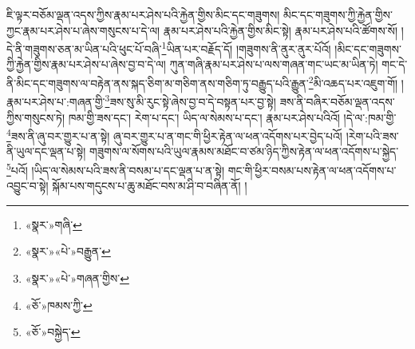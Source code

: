 ཇི་ལྟར་བཅོམ་ལྡན་འདས་ཀྱིས་རྣམ་པར་ཤེས་པའི་རྐྱེན་གྱིས་མིང་དང་གཟུགས། མིང་དང་གཟུགས་ཀྱི་རྐྱེན་གྱིས་ཀྱང་རྣམ་པར་ཤེས་པ་ཞེས་གསུངས་པ་དེ་ལ། རྣམ་པར་ཤེས་པའི་རྐྱེན་གྱིས་མིང་སྟེ། རྣམ་པར་ཤེས་པའི་ཚོགས་སོ། །དེ་ནི་གཟུགས་ཅན་མ་ཡིན་པའི་ཕུང་པོ་བཞི་\footnote{«སྣར་»གཞི་}ཡིན་པར་བརྗོད་དོ། །གཟུགས་ནི་ནུར་ནུར་པོའོ། །མིང་དང་གཟུགས་ཀྱི་རྐྱེན་གྱིས་རྣམ་པར་ཤེས་པ་ཞེས་བྱ་བ་དེ་ལ། ཀུན་གཞི་རྣམ་པར་ཤེས་པ་ལས་གཞན་གང་ཡང་མ་ཡིན་ཏེ། གང་དེ་ནི་མིང་དང་གཟུགས་ལ་བརྟེན་ནས་སྐད་ཅིག་མ་གཅིག་ནས་གཅིག་ཏུ་བརྒྱུད་པའི་རྒྱུན་\footnote{«སྣར་»«པེ་»བརྒྱུན་}མི་འཆད་པར་འཇུག་གོ། །རྣམ་པར་ཤེས་པ་:གཞན་གྱི་\footnote{«སྣར་»«པེ་»གཞན་གྱིས་}ཟས་སུ་མི་རུང་སྟེ་ཞེས་བྱ་བ་དེ་བསྟན་པར་བྱ་སྟེ། ཟས་ནི་བཞིར་བཅོམ་ལྡན་འདས་ཀྱིས་གསུངས་ཏེ། ཁམ་གྱི་ཟས་དང་། རེག་པ་དང་། ཡིད་ལ་སེམས་པ་དང་། རྣམ་པར་ཤེས་པའིའོ། །དེ་ལ་:ཁམ་གྱི་\footnote{«ཅོ་»ཁམས་ཀྱི་}ཟས་ནི་ཞུ་བར་གྱུར་པ་ན་སྟེ། ཞུ་བར་གྱུར་པ་ན་གང་གི་ཕྱིར་རྟེན་ལ་ཕན་འདོགས་པར་བྱེད་པའོ། །རེག་པའི་ཟས་ནི་ཡུལ་དང་ལྡན་པ་སྟེ། གཟུགས་ལ་སོགས་པའི་ཡུལ་རྣམས་མཐོང་བ་ཙམ་ཉིད་ཀྱིས་རྟེན་ལ་ཕན་འདོགས་པ་སྐྱེད་\footnote{«ཅོ་»བསྐྱེད་}པའོ། །ཡིད་ལ་སེམས་པའི་ཟས་ནི་བསམ་པ་དང་ལྡན་པ་ན་སྟེ། གང་གི་ཕྱིར་བསམ་པས་རྟེན་ལ་ཕན་འདོགས་པ་འབྱུང་བ་སྟེ། སྐོམ་པས་གདུངས་པ་ཆུ་མཐོང་བས་མ་ཤི་བ་བཞིན་ནོ། །
